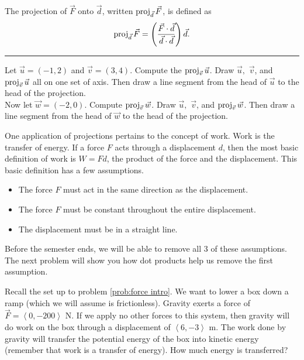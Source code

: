 \begin{definition}
The projection of $\vec F$ onto $\vec d$, written $\operatorname{proj}_{\vec d}\vec F$, is defined as $$\operatorname{proj}_{\vec d}\vec F = \left(\frac{\vec F\cdot \vec d}{\vec d\cdot \vec d}\right)\vec d.$$
\end{definition}

\hrule

\begin{problem} 
%
Let $\vec u=(-1,2)$ and $\vec v=(3,4)$. Compute the $\operatorname{proj}_{\vec v}\vec u$. Draw $\vec u,$ $\vec v$, and $\operatorname{proj}_{\vec v}\vec u$ all on one set of axis. Then draw a line segment from the head of $\vec u$ to the head of the projection.\\

Now let $\vec w=(-2,0)$. Compute $\operatorname{proj}_{\vec v}\vec w$. Draw $\vec u,$ $\vec v$, and $\operatorname{proj}_{\vec v}\vec w$. Then draw a line segment from the head of $\vec w$ to the head of the projection.

\end{problem}

One application of projections pertains to the concept of work. Work is the transfer of energy. If a force $F$ acts through a displacement $d$, then the most basic definition of work is $W=Fd$, the product of the force and the displacement.  This basic definition has a few assumptions.
\begin{itemize}
\item The force $F$ must act in the same direction as the displacement.
\item The force $F$ must be constant throughout the entire displacement.
\item The displacement must be in a straight line.
\end{itemize}
Before the semester ends, we will be able to remove all 3 of these assumptions.  The next problem will show you how dot products help us remove the first assumption.

Recall the set up to problem \ref{prob:force intro}.  We want to lower a box down a ramp (which we will assume is frictionless). Gravity exerts a force of $\vec F=\left<0,-200\right>$ N. If we apply no other forces to this system, then gravity will do work on the box through a displacement of $\left<6,-3\right>$ m. The work done by gravity will transfer the potential energy of the box into kinetic energy (remember that work is a transfer of energy).  How much energy is transferred?

